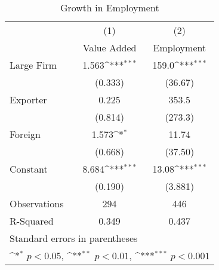 \begin{table}[htbp]\centering
\def\sym#1{\ifmmode^{#1}\else\(^{#1}\)\fi}
\caption{Growth in Employment}
\begin{tabular}{l*{2}{c}}
\hline\hline
            &\multicolumn{1}{c}{(1)}&\multicolumn{1}{c}{(2)}\\
            &\multicolumn{1}{c}{Value Added}&\multicolumn{1}{c}{Employment}\\
\hline
Large Firm  &       1.563\sym{***}&       159.0\sym{***}\\
            &     (0.333)         &     (36.67)         \\
[1em]
Exporter    &       0.225         &       353.5         \\
            &     (0.814)         &     (273.3)         \\
[1em]
Foreign     &       1.573\sym{*}  &       11.74         \\
            &     (0.668)         &     (37.50)         \\
[1em]
Constant    &       8.684\sym{***}&       13.08\sym{***}\\
            &     (0.190)         &     (3.881)         \\
\hline
Observations&         294         &         446         \\
R-Squared   &       0.349         &       0.437         \\
\hline\hline
\multicolumn{3}{l}{\footnotesize Standard errors in parentheses}\\
\multicolumn{3}{l}{\footnotesize \sym{*} \(p<0.05\), \sym{**} \(p<0.01\), \sym{***} \(p<0.001\)}\\
\end{tabular}
\end{table}

